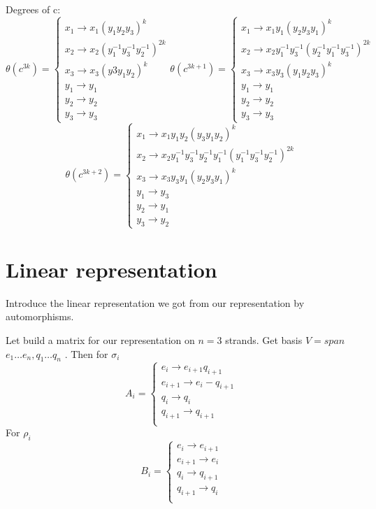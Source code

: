 \documentclass{article}
\begin{document}
Degrees of c:
$$
\theta(c^{3k}) =
\begin{cases}
	x_1 \rightarrow x_1 (y_1 y_2y_3)^{k}\\
	x_2 \rightarrow x_2 (y_1^{-1} y_3^{-1} y_2^{-1})^{2k}\\
	x_3 \rightarrow x_3 (y3 y_1 y_2)^{k}\\
	y_1 \rightarrow y_1\\
	y_2 \rightarrow y_2\\
	y_3 \rightarrow y_3
\end{cases}
\theta(c^{3k+1}) =
\begin{cases}
	x_1 \rightarrow x_1 y_1 (y_2 y_3 y_1)^{k}\\
	x_2 \rightarrow x_2 y_1^{-1} y_3^{-1}(y_2^{-1} y_1^{-1} y_3^{-1})^{2k}\\
	x_3 \rightarrow x_3 y_3 (y_1 y_2 y_3)^k\\
	y_1 \rightarrow y_1\\
	y_2 \rightarrow y_2\\
	y_3 \rightarrow y_3
\end{cases} 
$$
$$
\theta(c^{3k+2}) =
\begin{cases}
	x_1 \rightarrow x_1 y_1 y_2 (y_3 y_1 y_2)^{k} \\
	x_2 \rightarrow x_2 y_1^{-1} y_3^{-1} y_2^{-1} y_1^{-1} (y_1^{-1} y_3^{-1} y_2^{-1})^{2k}\\
	x_3 \rightarrow x_3 y_3 y_1 (y_2 y_3 y_1)^k\\
	y_1 \rightarrow y_3\\
	y_2 \rightarrow y_1\\
	y_3 \rightarrow y_2
\end{cases}
$$
\section{Linear representation}
Introduce the linear representation we got from our representation by automorphisms.

Let build a matrix for our representation on $n=3$ strands. Get basis $V = span$ { $e_1 \dots e_n, q_1 \dots q_n$ }. Then for $\sigma_i$ 
$$
A_i = 
\begin{cases}
	e_i \rightarrow e_{i+1}q_{i+1}\\
	e_{i+1}\rightarrow  e_i-q_{i+1}\\
	q_i\rightarrow  q_i\\
	q_{i+1}\rightarrow  q_{i+1}\\
\end{cases}
$$
For $\rho_i$ 
$$
B_i = 
\begin{cases}
	e_i\rightarrow e_{i+1}\\
	e_{i+1}\rightarrow e_i\\
	q_i\rightarrow q_{i+1}\\
	q_{i+1}\rightarrow q_i\\
\end{cases}
$$
\end{document}
